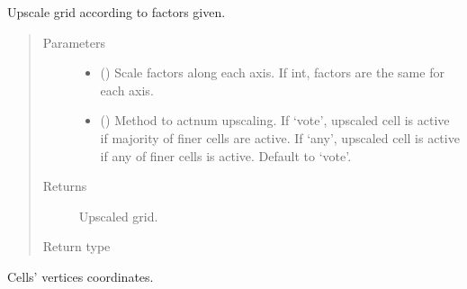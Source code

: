 \documentclass[letterpaper,10pt,english]{sphinxmanual}
\begin{document}
\begin{fulllineitems}
\begin{fulllineitems}
\label{\detokenize{api/grids:geology.src.OrthogonalUniformGrid.upscale}}
Upscale grid according to factors given.
\begin{quote}\begin{description}
\item[{Parameters}] \leavevmode\begin{itemize}
\item {} 
 (\sphinxstyleliteralemphasis{\sphinxupquote{, }}) \textendash{} Scale factors along each axis. If int, factors are the same for each axis.

\item {} 
 () \textendash{} Method to actnum upscaling. If ‘vote’, upscaled cell is active if majority
of finer cells are active. If ‘any’, upscaled cell is active if any
of finer cells is active. Default to ‘vote’.

\end{itemize}

\item[{Returns}] \leavevmode
{} \textendash{} Upscaled grid.

\item[{Return type}] \leavevmode
{\hyperref[\detokenize{api/grids:geology.src.OrthogonalUniformGrid}]{}}

\end{description}\end{quote}

\end{fulllineitems}


\begin{fulllineitems}
\label{\detokenize{api/grids:geology.src.OrthogonalUniformGrid.xyz}}
Cells’ vertices coordinates.

\end{fulllineitems}


\end{fulllineitems}
\end{document}
